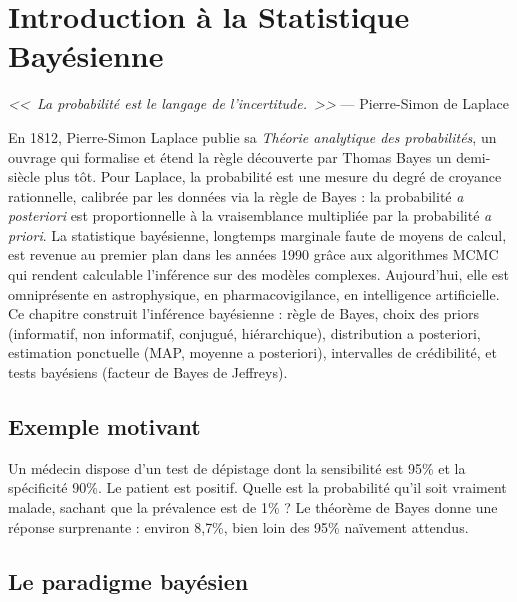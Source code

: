 \chapter{Introduction \`a la Statistique Bay\'esienne}
\label{ch:bayesienne}

\begin{center}
\textit{<<~La probabilit\'e est le langage de l'incertitude.~>>} --- Pierre-Simon de Laplace
\end{center}

En 1812, Pierre-Simon Laplace publie sa \emph{Théorie analytique des probabilités}, un ouvrage qui formalise et étend la règle découverte par Thomas Bayes un demi-siècle plus tôt. Pour Laplace, la probabilité est une mesure du degré de croyance rationnelle, calibrée par les données via la règle de Bayes : la probabilité \emph{a posteriori} est proportionnelle à la vraisemblance multipliée par la probabilité \emph{a priori}. La statistique bayésienne, longtemps marginale faute de moyens de calcul, est revenue au premier plan dans les années 1990 grâce aux algorithmes MCMC qui rendent calculable l'inférence sur des modèles complexes. Aujourd'hui, elle est omniprésente en astrophysique, en pharmacovigilance, en intelligence artificielle. Ce chapitre construit l'inférence bayésienne : règle de Bayes, choix des priors (informatif, non informatif, conjugué, hiérarchique), distribution a posteriori, estimation ponctuelle (MAP, moyenne a posteriori), intervalles de crédibilité, et tests bayésiens (facteur de Bayes de Jeffreys).

\section{Exemple motivant}

Un m\'edecin dispose d'un test de d\'epistage dont la sensibilit\'e est 95\% et la sp\'ecificit\'e 90\%. Le patient est positif. Quelle est la probabilit\'e qu'il soit vraiment malade, sachant que la pr\'evalence est de 1\% ? Le th\'eor\`eme de Bayes donne une r\'eponse surprenante : environ 8{,}7\%, bien loin des 95\% na\"ivement attendus.

\section{Le paradigme bay\'esien}

